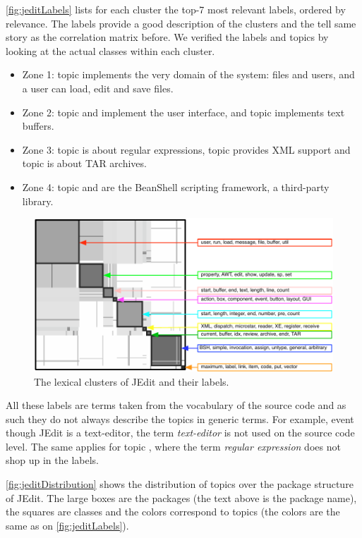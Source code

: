 \autoref{fig:jeditLabels} lists for each cluster the top-7 most relevant labels, ordered by relevance. The labels provide a good description of the clusters and the tell same story as the correlation matrix before. We verified the labels and topics by looking at the actual classes within each cluster.

\begin{itemize}
  \item Zone 1: topic \red implements the very domain of the system: files and users, and a user can load, edit and save files.
  \item Zone 2: topic \green and \magenta implement the user interface, and topic \pink implements text buffers.
  \item Zone 3: topic \cyan is about regular expressions, topic \yellow provides XML support and topic \darkgreen is about TAR archives.
  \item Zone 4: topic \blue and \orange are the BeanShell scripting framework, a third-party library.
\end{itemize}

\begin{figure}[h]
\centering
\includegraphics[width=0.8\columnwidth]{fig/hapax-jedit-correlation-labels}
\caption{The lexical clusters of JEdit and their labels.}\label{fig:jeditLabels}
\end{figure}

All these labels are terms taken from the vocabulary of the source code and as such they do not always describe the topics in generic terms. For example, event though JEdit is a text-editor, the term \emph{text-editor} is not used on the source code level. The same applies for topic \cyan, where the term \emph{regular expression} does not shop up in the labels.

\autoref{fig:jeditDistribution} shows the distribution of topics over the package structure of JEdit. The large boxes are the packages (the text above is the package name), the squares are classes and the colors correspond to topics (the colors are the same as on \autoref{fig:jeditLabels}).

